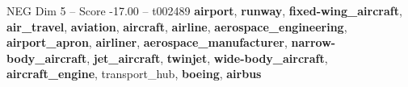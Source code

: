 \begin{textsample}{NEG Dim 5 – Score -17.00 – t002489}  \label{ex:f5_neg_020}
\textbf{airport}, \textbf{runway}, \textbf{fixed-wing\_aircraft}, \textbf{air\_travel}, \textbf{aviation}, \textbf{aircraft}, \textbf{airline}, \textbf{aerospace\_engineering}, \textbf{airport\_apron}, \textbf{airliner}, \textbf{aerospace\_manufacturer}, \textbf{narrow-body\_aircraft}, \textbf{jet\_aircraft}, \textbf{twinjet}, \textbf{wide-body\_aircraft}, \textbf{aircraft\_engine}, transport\_hub, \textbf{boeing}, \textbf{airbus}

\end{textsample}
